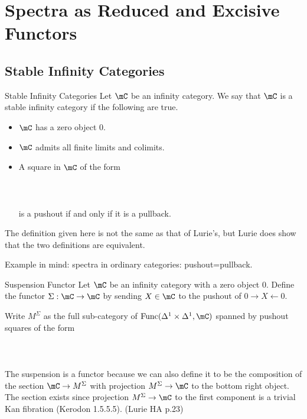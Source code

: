 \documentclass[a4paper]{article}
\begin{document}
\pagebreak
\section{Spectra as Reduced and Excisive Functors}
\subsection{Stable Infinity Categories}
\begin{defn}{Stable Infinity Categories}{} Let $\mC$ be an infinity category. We say that $\mC$ is a stable infinity category if the following are true. 
\begin{itemize}
\item $\mC$ has a zero object $0$. 
\item $\mC$ admits all finite limits and colimits. 
\item A square in $\mC$ of the form \\~\\
\\~\\
is a pushout if and only if it is a pullback. 
\end{itemize}
\end{defn}

The definition given here is not the same as that of Lurie's, but Lurie does show that the two definitions are equivalent. 

Example in mind: spectra in ordinary categories: pushout=pullback. 

\begin{defn}{Suspension Functor}{} Let $\mC$ be an infinity category with a zero object $0$. Define the functor $\Sigma:\mC\to\mC$ by sending $X\in\mC$ to the pushout of $0\rightarrow X\leftarrow 0$. 
\end{defn}

Write $M^\Sigma$ as the full sub-category of $\text{Func}(\Delta^1\times\Delta^1,\mC)$ spanned by pushout squares of the form \\~\\
\\~\\
The suspension is a functor because we can also define it to be the composition of the section $\mC\to M^\Sigma$ with projection $M^\Sigma\to\mC$ to the bottom right object. The section exists since projection $M^\Sigma\to\mC$ to the first component is a trivial Kan fibration (Kerodon 1.5.5.5). (Lurie HA p.23)
\end{document}
